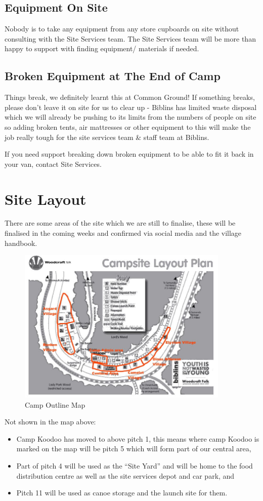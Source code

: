 \documentclass[a4paper, 11pt]{report}
\newcommand{\nl}{\newline}
\begin{document}
\section{Equipment On Site}
Nobody is to take any equipment from any store cupboards on site without consulting with the Site Services team. The Site Services team will be more than happy to support with finding equipment/ materials if needed.

\section{Broken Equipment at The End of Camp}
Things break, we definitely learnt this at Common Ground! If something breaks, please don't leave it on site for us to clear up - Biblins has limited waste disposal which we will already be pushing to its limits from the numbers of people on site so adding broken tents, air mattresses or other equipment to this will make the job really tough for the site services team \& staff team at Biblins.\nl

If you need support breaking down broken equipment to be able to fit it back in your van, contact Site Services.

\chapter{Site Layout}
There are some areas of the site which we are still to finalise, these will be finalised in the coming weeks and confirmed via social media and the village handbook. 
\begin{figure}[H]
    \centering
    \includegraphics[width=0.9\textwidth]{camp-map-v1.jpg}
    \caption{Camp Outline Map}
\end{figure}
Not shown in the map above:
\begin{itemize}
    \item Camp Koodoo has moved to above pitch 1, this means where camp Koodoo is marked on the map will be pitch 5 which will form part of our central area,
    \item Part of pitch 4 will be used as the ``Site Yard'' and will be home to the food distribution centre as well as the site services depot and car park, and
    \item Pitch 11 will be used as canoe storage and the launch site for them. 
\end{itemize}
\end{document}
